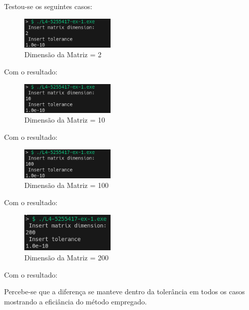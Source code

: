 \documentclass[12pt, a4paper]{article} %
\begin{document}
        Testou-se os seguintes casos:
        \begin{figure}[H]
            \centering
            \includegraphics[width=0.4\textwidth]{../images/ex1-input-2.png}
            \caption{Dimens\~ao da Matriz = 2}
        \end{figure}
        Com o resultado:
        
        \begin{figure}[H]
            \centering
            \includegraphics[width=0.4\textwidth]{../images/ex1-input-10.png}
            \caption{Dimens\~ao da Matriz = 10}
        \end{figure}
        Com o resultado:
        
        \begin{figure}[H]
            \centering
            \includegraphics[width=0.4\textwidth]{../images/ex1-input-100.png}
            \caption{Dimens\~ao da Matriz = 100}
        \end{figure}
        Com o resultado:
        
        \begin{figure}[H]
            \centering
            \includegraphics[width=0.4\textwidth]{../images/ex1-input-200.png}
            \caption{Dimens\~ao da Matriz = 200}
        \end{figure}
        Com o resultado:
        

        Percebe-se que a diferen\c{c}a se manteve dentro da toler\^ancia em todos os casos mostrando a efici\^ancia do m\'etodo empregado.
\end{document}
